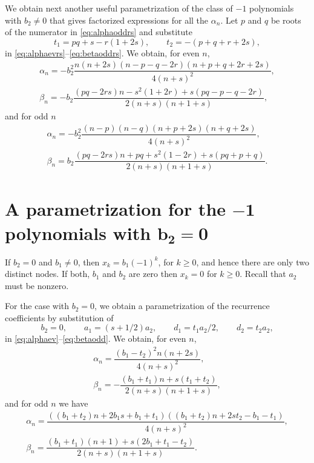 \documentclass[10pt,a4paper]{amsart}
\numberwithin{equation}{section}
\begin{document}
 We obtain next another useful parametrization of the class of $-1$ polynomials with $b_2 \ne 0$ that gives factorized expressions for all the $\alpha_n$.
 Let $p$ and $q$ be roots of the numerator in \eqref{eq:alphaoddrs} and substitute
\[ t_1=p q +s -r ( 1+ 2s), \qquad t_2=-(p+q+r+2s), \]
 in \eqref{eq:alphaevrs}--\eqref{eq:betaoddrs}.
 We obtain, for even $n$,
\begin{gather*}%
\alpha_n=-b_2^2\dfrac{n ( n+ 2s) (n-p-q- 2 r) ( n+p+q+2r+ 2s)}{4(n+s)^2},
\\ %
\beta_n=- b_2\dfrac{(pq-2 rs) n - s^2 ( 1+2r) +s (pq-p-q-2r)}{2 (n+s) ( n+1+s)},
 \end{gather*}
 and for odd $n$
\begin{gather*}%
	\alpha_n=-b_2^2\dfrac{(n-p) (n-q) ( n+p+ 2s) (n+q + 2 s) }{4(n+s)^2},
\\ %
\beta_n= b_2\dfrac{(pq-2 rs) n + p q+ s^2 ( 1-2r) +s (pq+p+q)}{2 (n+s) ( n+1+s)}.
 \end{gather*}

 \section[A parametrization for the -1 polynomials with b\_2=0]{A parametrization for the $\boldsymbol{-1}$ polynomials with $\boldsymbol{b_2=0}$}\label{section5}

 If $b_2=0$ and $b_1 \ne 0$, then $x_k= b_1 (-1)^k$, for $k\ge 0$, and hence there are only two distinct nodes. If both, $b_1$ and $b_2$ are zero then $x_k=0$ for $k\ge 0$. Recall that $a_2$ must be nonzero.

 For the case with $b_2=0$, we obtain a parametrization of the recurrence coefficients by substitution of
 \[ b_2=0,\qquad a_1=(s+ 1/2) a_2, \qquad d_1=t_1 a_2/2, \qquad d_2= t_2 a_2, \]
 in \eqref{eq:alphaev}--\eqref{eq:betaodd}. We obtain, for even $n$,
\begin{gather}\label{eq:alphaevb2}
\alpha_n=\dfrac{(b_1-t_2)^2 n ( n+2 s)}{4 (n+s)^2},
\\
\label{eq:betaevb2}
\beta_n=-\dfrac{(b_1+ t_1) n + s ( t_1+ t_2)}{2(n+s) ( n+1+s)},
\end{gather}
and for odd $n$ we have
\begin{gather}\label{eq:alphaoddb2}
	\alpha_n=\dfrac{((b_1+t_2) n + 2 b_1 s+ b_1+t_1)( (b_1+ t_2)n+2 s t_2 - b_1 - t_1) }{4 (n+s)^2},
\\\label{eq:betaoddb2}
	\beta_n=\dfrac{ (b_1+ t_1) (n+1) + s(2 b_1+t_1-t_2) }{2(n+s) ( n+1+s)}.
\end{gather}
\end{document}
